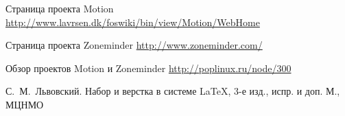 \begin{thebibliography}{2013}
  Страница проекта Motion
  \url{http://www.lavrsen.dk/foswiki/bin/view/Motion/WebHome}

  Страница проекта Zoneminder
  \url{http://www.zoneminder.com/}

  Обзор проектов Motion и Zoneminder
  \url{http://poplinux.ru/node/300}

\by С.~М.~Львовский.
\book Набор и верстка в системе \LaTeX, 3-е изд., испр. и доп.
\publaddr М., МЦНМО

\end{thebibliography}

\endinput
